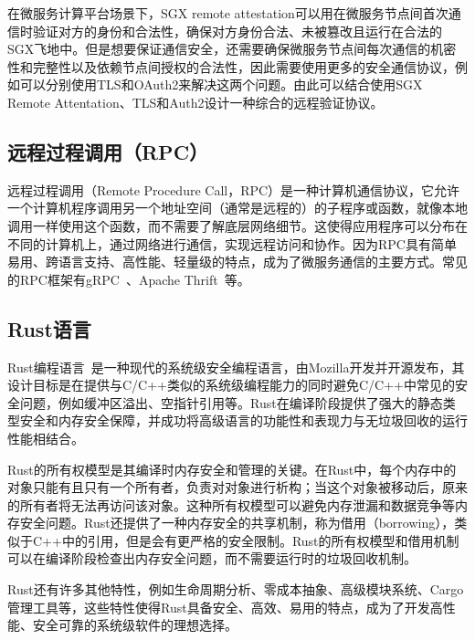 在微服务计算平台场景下，SGX remote attestation可以用在微服务节点间首次通信时验证对方的身份和合法性，确保对方身份合法、未被篡改且运行在合法的SGX飞地中。但是想要保证通信安全，还需要确保微服务节点间每次通信的机密性和完整性以及依赖节点间授权的合法性，因此需要使用更多的安全通信协议，例如可以分别使用TLS和OAuth2来解决这两个问题。由此可以结合使用SGX Remote Attentation、TLS和Auth2设计一种综合的远程验证协议。

\subsection{远程过程调用（RPC）}

远程过程调用（Remote Procedure Call，RPC）是一种计算机通信协议，它允许一个计算机程序调用另一个地址空间（通常是远程的）的子程序或函数，就像本地调用一样使用这个函数，而不需要了解底层网络细节。这使得应用程序可以分布在不同的计算机上，通过网络进行通信，实现远程访问和协作。因为RPC具有简单易用、跨语言支持、高性能、轻量级的特点，成为了微服务通信的主要方式。常见的RPC框架有gRPC~\cite{}、Apache Thrift~\cite{}等。

\subsection{Rust语言}

Rust编程语言~\cite{}是一种现代的系统级安全编程语言，由Mozilla开发并开源发布，其设计目标是在提供与C/C++类似的系统级编程能力的同时避免C/C++中常见的安全问题，例如缓冲区溢出、空指针引用等。Rust在编译阶段提供了强大的静态类型安全和内存安全保障，并成功将高级语言的功能性和表现力与无垃圾回收的运行性能相结合。

Rust的所有权模型是其编译时内存安全和管理的关键。在Rust中，每个内存中的对象只能有且只有一个所有者，负责对对象进行析构；当这个对象被移动后，原来的所有者将无法再访问该对象。这种所有权模型可以避免内存泄漏和数据竞争等内存安全问题。Rust还提供了一种内存安全的共享机制，称为借用（borrowing），类似于C++中的引用，但是会有更严格的安全限制。Rust的所有权模型和借用机制可以在编译阶段检查出内存安全问题，而不需要运行时的垃圾回收机制。

Rust还有许多其他特性，例如生命周期分析、零成本抽象、高级模块系统、Cargo管理工具等，这些特性使得Rust具备安全、高效、易用的特点，成为了开发高性能、安全可靠的系统级软件的理想选择。
